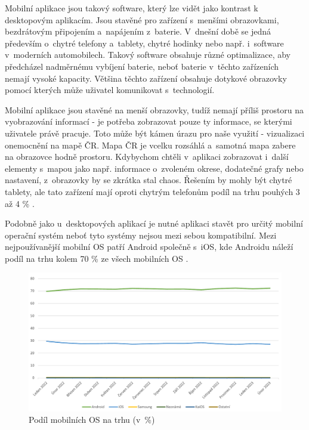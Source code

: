 Mobilní aplikace jsou takový software, který lze vidět jako kontrast k desktopovým aplikacím. Jsou stavěné pro zařízení s~menšími obrazovkami, bezdrátovým připojením a~napájením z~baterie. V~dnešní době se jedná především o~chytré telefony a~tablety, chytré hodinky nebo např. i~software v~moderních automobilech. Takový software obsahuje různé optimalizace, aby předcházel nadměrnému vybíjení baterie, neboť baterie v~těchto zařízeních nemají vysoké kapacity. Většina těchto zařízení obsahuje dotykové obrazovky pomocí kterých může uživatel komunikovat s~technologií.

Mobilní aplikace jsou stavěné na menší obrazovky, tudíž nemají příliš prostoru na vyobrazování informací - je potřeba zobrazovat pouze ty informace, se kterými uživatele právě pracuje. Toto může být kámen úrazu pro naše využití - vizualizaci onemocnění na mapě ČR. Mapa ČR je vcelku rozsáhlá a~samotná mapa zabere na obrazovce hodně prostoru. Kdybychom chtěli v~aplikaci zobrazovat i~další elementy s~mapou jako např. informace o~zvoleném okrese, dodatečné grafy nebo nastavení, z~obrazovky by se zkrátka stal chaos. Řešením by mohly být chytré tablety, ale tato zařízení mají oproti chytrým telefonům podíl na trhu pouhých 3 až 4 \% \cite{marketshare-mobile-tablet}.

Podobně jako u~desktopových aplikací je nutné aplikaci stavět pro určitý mobilní operační systém neboť tyto systémy nejsou mezi sebou kompatibilní. Mezi nejpoužívanější mobilní OS patří Android společně s~iOS, kde Androidu náleží podíl na trhu kolem 70 \% ze všech mobilních OS \cite{marketshare-mobile-os}.

\begin{figure}
	\centering
	\includegraphics[width=1\textwidth]{Pictures/graf2.pdf}
	\caption{Podíl mobilních OS na trhu (v~\%) \cite{marketshare-mobile-os}}
	\label{fig:MarketshareMobileOS}
\end{figure}


